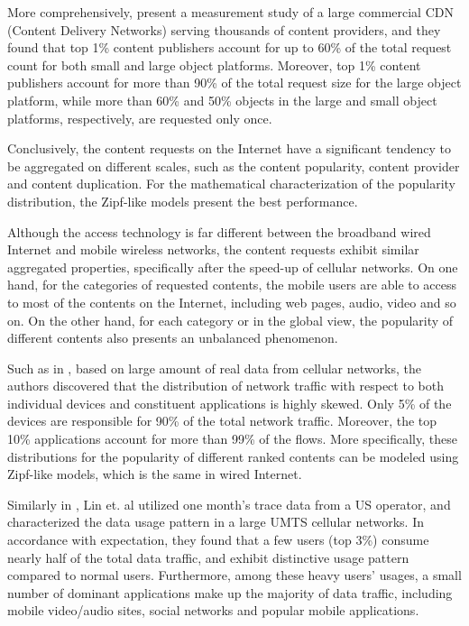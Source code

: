 More comprehensively, \cite{shafiq2016characterizing} present a measurement study of a large commercial CDN (Content Delivery Networks) serving thousands of content providers, and they found that top 1\% content publishers account for up to 60\% of the total request count for both small and large object platforms. Moreover, top 1\% content publishers account for more than 90\% of the total request size for the large object platform, while more than 60\% and 50\% objects in the large and small object platforms, respectively, are requested only once.

Conclusively, the content requests on the Internet have a significant tendency to be aggregated on different scales, such as the content popularity, content provider and content duplication. For the mathematical characterization of the popularity distribution, the Zipf-like models present the best performance.

Although the access technology is far different between the broadband wired Internet and mobile wireless networks, the content requests exhibit similar aggregated properties, specifically after the speed-up of cellular networks. On one hand, for the categories of requested contents, the mobile users are able to access to most of the contents on the Internet, including web pages, audio, video and so on. On the other hand, for each category or in the global view, the popularity of different contents also presents an unbalanced phenomenon.

Such as in \cite{shafiq2011characterizing}, based on large amount of real data from cellular networks, the authors discovered that the distribution of network traffic with respect to both individual devices and constituent applications is highly skewed. Only 5\% of the devices are responsible for 90\% of the total network traffic. Moreover, the top 10\% applications account for more than 99\% of the flows. More specifically, these distributions for the popularity of different ranked contents can be modeled using Zipf-like models, which is the same in wired Internet.

Similarly in \cite{jin2012characterizing}, Lin et. al utilized one month's trace data from a US operator, and characterized the data usage pattern in a large UMTS cellular networks. In accordance with expectation, they found that a few users (top 3\%) consume nearly half of the total data traffic, and exhibit distinctive usage pattern compared to normal users. Furthermore, among these heavy users' usages, a small number of dominant applications make up the majority of data traffic, including mobile video/audio sites, social networks and popular mobile applications.

